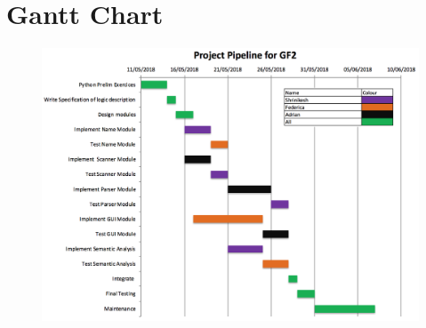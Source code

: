 \documentclass[a4paper,11pt]{article}
\numberwithin{equation}{section}
\begin{document}
\begin{appendices} \label{app}
	\section{Gantt Chart}
	\begin{figure}[H]
		\centering
		\includegraphics[width=\linewidth]{gantt.png}
	\end{figure}
	

\end{appendices}
\end{document}
